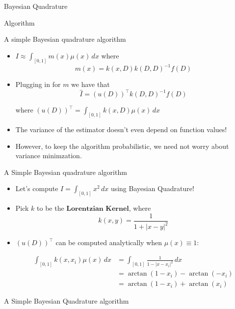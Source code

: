 \documentclass{beamer}
\begin{document}
\begin{section}{Bayesian Quadrature}
\begin{subsection}{Algorithm}
\begin{frame}{A simple Bayesian quadrature algorithm}
    \begin{itemize}
        \item $I \approx \int_{[0,1]}m(x)\mu(x)\,dx$ where $$m(x) = k(x,D)k(D,D)^{-1}f(D)$$
        \pause
        \item Plugging in for $m$ we have that 
        \pause
        $$ \hat{I} = (u(D))^{\top}k(D,D)^{-1}f(D)$$
        
        where $(u(D))^{\top} = \int_{[0,1]}k(x,D)\mu(x)\,dx$
        \pause
        \item The variance of the estimator doesn't even depend on function values!
        \pause 
        \item However, to keep the algorithm probabilistic, we need not worry about variance minimzation. 
    \end{itemize}
\end{frame}

\begin{frame}{A Simple Bayesian quadrature algorithm}
    \begin{itemize}
        \item Let's compute $I = \int_{[0,1]}x^2\,dx$ using Bayesian Quadrature! 
        \pause
        \item Pick \(k\) to be the \(\textbf{Lorentzian Kernel}\), where 
        \[ k(x,y) = \frac{1}{1+|x-y|^2}\]
        \pause
        \item \((u(D))^{\top}\) can be computed analytically when \(\mu(x) \equiv 1\):
        
        \begin{align*}
            \int_{[0,1]}k(x,x_i)\mu(x)\,dx &= \int_{[0,1]}\frac{1}{1-|x-x_i|^2}\,dx \\ 
            &= \arctan(1-x_i) - \arctan(-x_i) \\
            &= \arctan(1-x_i) + \arctan(x_i)
            \end{align*}
    \end{itemize}
\end{frame}

\begin{frame}{A Simple Bayesian Quadrature algorithm}


\end{frame}
\end{subsection}
\end{section}
\end{document}
